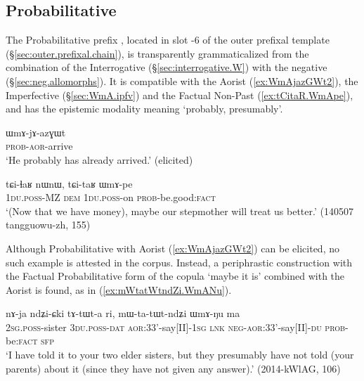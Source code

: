 \subsection{Probabilitative} \label{sec:WmA}
The Probabilitative prefix , located in slot -6 of the outer prefixal template (§\ref{sec:outer.prefixal.chain}), is transparently grammaticalized from the combination of the Interrogative  (§\ref{sec:interrogative.W}) with the negative  (§\ref{sec:neg.allomorphs}). It is compatible with the Aorist  (\ref{ex:WmAjazGWt2}), the Imperfective (§\ref{sec:WmA.ipfv}) and the Factual Non-Past (\ref{ex:tCitaR.WmApe}), and has the epistemic modality meaning `probably, presumably'.

 \begin{exe}
 \ex \label{ex:WmAjazGWt2}
\gll ɯmɤ-jɤ-azɣɯt  \\
\textsc{prob}-\textsc{aor}-arrive \\
\glt `He probably has already arrived.' (elicited)
\end{exe}

 \begin{exe}
 \ex \label{ex:tCitaR.WmApe}
\gll tɕi-ɬaʁ nɯnɯ, tɕi-taʁ ɯmɤ-pe \\
\textsc{1du}.\textsc{poss}-MZ \textsc{dem} \textsc{1du}.\textsc{poss}-on \textsc{prob}-be.good:\textsc{fact} \\
\glt `(Now that we have money), maybe our stepmother will treat us better.' (140507 tangguowu-zh, 155)
\end{exe}

Although Probabilitative with Aorist (\ref{ex:WmAjazGWt2}) can be elicited, no such example is attested in the corpus. Instead, a periphrastic construction with the Factual Probabilitative form of the copula  `maybe it is' combined with the Aorist is found, as in (\ref{ex:mWtatWtndZi.WmANu}).
 
 \begin{exe}
 \ex \label{ex:mWtatWtndZi.WmANu}
\gll nɤ-ja ndʑi-ɕki tɤ-tɯt-a ri, mɯ-ta-tɯt-ndʑi ɯmɤ-ŋu ma \\
\textsc{2sg}.\textsc{poss}-sister \textsc{3du}.\textsc{poss}-\textsc{dat} \textsc{aor}:3\fl{}3'-say[II]-\textsc{1sg} \textsc{lnk} \textsc{neg}-\textsc{aor}:3\fl{}3'-say[II]-\textsc{du} \textsc{prob}-be:\textsc{fact} \textsc{sfp} \\
\glt `I have told it to your two elder sisters, but they presumably have not told (your parents) about it (since they have not given any answer).' (2014-kWlAG, 106)
\end{exe}

